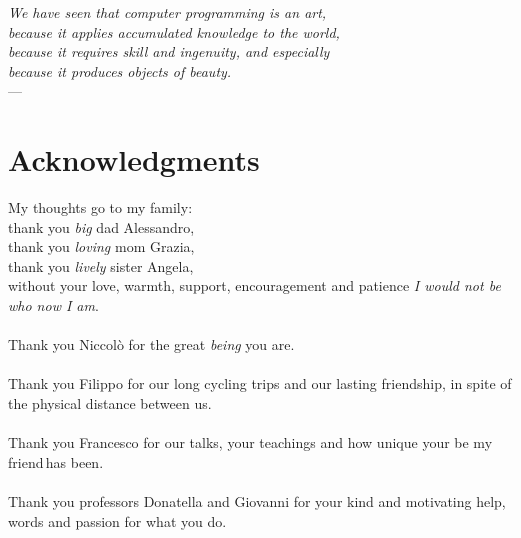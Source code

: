 
\begin{flushright}{\slshape    
    We have seen that computer programming is an art, \\ 
    because it applies accumulated knowledge to the world, \\ 
    because it requires skill and ingenuity, and especially \\
    because it produces objects of beauty.} \\ \medskip
    ---  \citep{knuth:1974}
\end{flushright}



\bigskip

\begingroup
\let\clearpage\relax
\let\cleardoublepage\relax
\let\cleardoublepage\relax

\chapter*{Acknowledgments}

My thoughts go to my family: \\
\indent thank you \emph{big} dad Alessandro, \\
\indent thank you \emph{loving} mom Grazia,\\
\indent thank you  \emph{lively} sister Angela, \\
without your love, warmth, support, encouragement 
and patience \emph{I would not be who now I am}.
\\\\
Thank you Niccol\`o for the great \emph{being} you are.
\\\\
Thank you Filippo for our long cycling trips and our lasting
friendship, in spite of the physical distance between us.
\\\\
Thank you Francesco for our talks,
your teachings and how unique your \flqq be my friend\frqq\,has been.
\\\\
Thank you professors Donatella and Giovanni for your kind and motivating help,
words and passion for what you do.


